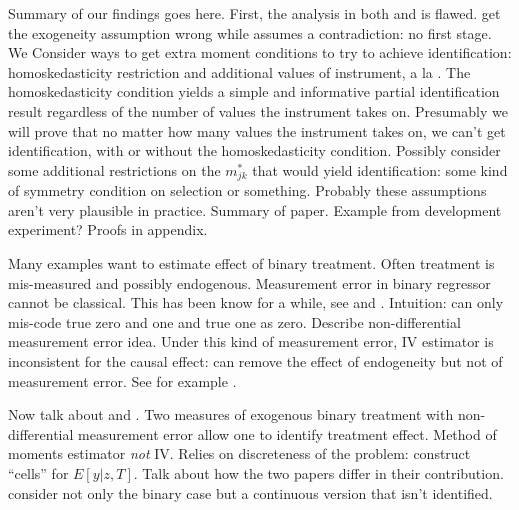 Summary of our findings goes here. 
First, the analysis in both \cite{FL} and \cite{Mahajan} is flawed.
\cite{FL} get the exogeneity assumption wrong while \cite{Mahajan} assumes a contradiction: no first stage.
We Consider ways to get extra moment conditions to try to achieve identification: homoskedasticity restriction and additional values of instrument, a la \cite{Lewbel}.
The homoskedasticity condition yields a simple and informative partial identification result regardless of the number of values the instrument takes on.
Presumably we will prove that no matter how many values the instrument takes on, we can't get identification, with or without the homoskedasticity condition.
Possibly consider some additional restrictions on the $m^*_{jk}$ that would yield identification: some kind of symmetry condition on selection or something.
Probably these assumptions aren't very plausible in practice.
Summary of paper.
Example from development experiment?
Proofs in appendix.

Many examples want to estimate effect of binary treatment.
Often treatment is mis-measured and possibly endogenous.
Measurement error in binary regressor cannot be classical.
This has been know for a while, see \cite{Aigner} and \cite{Bollinger}.
Intuition: can only mis-code true zero and one and true one as zero.
Describe non-differential measurement error idea.
Under this kind of measurement error, IV estimator is inconsistent for the causal effect: can remove the effect of endogeneity but not of measurement error.
See for example \cite{KRS,BBS,FL}.


Now talk about \cite{KRS} and \cite{BBS}.
Two measures of exogenous binary treatment with non-differential measurement error allow one to identify treatment effect.
Method of moments estimator \emph{not} IV.
Relies on discreteness of the problem: construct ``cells'' for $E[y|z,T]$.
Talk about how the two papers differ in their contribution.
\cite{BBS} consider not only the binary case but a continuous version that isn't identified.

